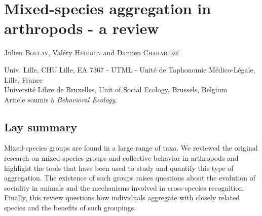 
\chapter{Mixed-species aggregation in arthropods - a review} %

\label{Chapter1} %


Julien \textsc{Boulay}, Valéry \textsc{Hédouin} and Damien \textsc{Charabidzé}

 Univ. Lille, CHU Lille, EA 7367 - UTML - Unité de Taphonomie Médico-Légale, Lille, France\\
 Université Libre de Bruxelles, Unit of Social Ecology, Brussels, Belgium\\


Article soumis à \emph{Behavioral Ecology}.


\cleardoublepage

	\section{Lay summary}
Mixed-species groups are found in a large range of taxa. We reviewed the original research on mixed-species groups and collective behavior in arthropods and highlight the tools that have been used to study and quantify this type of aggregation. The existence of such groups raises questions about the evolution of sociality in animals and the mechanisms involved in cross-species recognition. Finally, this review questions how individuals aggregate with closely related species and the benefits of such groupings. 

